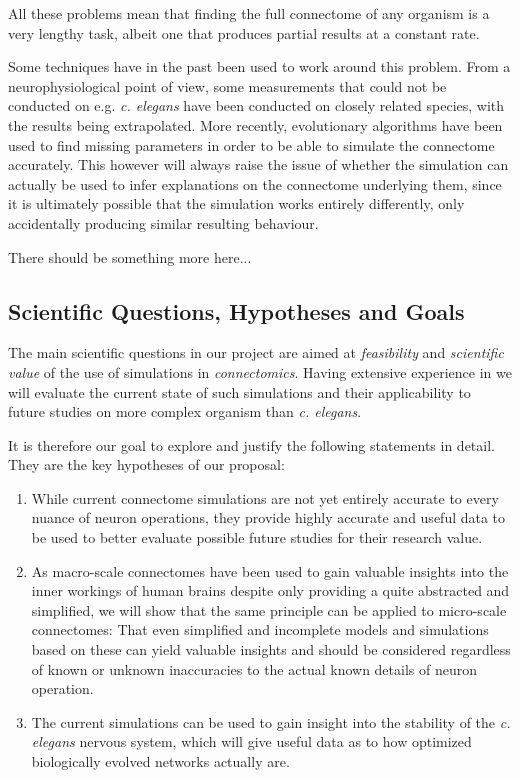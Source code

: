 \documentclass[a4paper,11pt]{article}
\begin{document}
All these problems mean that finding the full connectome of any organism is a very lengthy task, albeit one that produces partial results at a constant rate.

Some techniques have in the past been used to work around this problem. From a neurophysiological point of view, some measurements that could not be conducted on e.g. \emph{c. elegans} have been conducted on closely related species, with the results being extrapolated. More recently, evolutionary algorithms have been used to find missing parameters in order to be able to simulate the connectome accurately. This however will always raise the issue of whether the simulation can actually be used to infer explanations on the connectome underlying them, since it is ultimately possible that the simulation works entirely differently, only accidentally producing similar resulting behaviour. 

There should be something more here... 

\subsection{Scientific Questions, Hypotheses and Goals}

The main scientific questions in our project are aimed at \emph{feasibility} and  \emph{scientific value} of the use of simulations in \emph {connectomics}. Having extensive experience in  we will evaluate the current state of such simulations and their applicability to future studies on more complex organism than \emph{c. elegans}. 

It is therefore our goal to explore and justify the following statements in detail. They are the key hypotheses of our proposal:
\begin{enumerate}
\item While current connectome simulations are not yet entirely accurate to every nuance of neuron operations, they provide highly accurate and useful data to be used to better evaluate possible future studies for their research value. 
\item As macro-scale connectomes have been used to gain valuable insights into the inner workings of human brains despite only providing a quite abstracted and simplified, we will show that the same principle can be applied to micro-scale connectomes: That even simplified and incomplete models and simulations based on these can yield valuable insights and should be considered regardless of known or unknown inaccuracies to the actual known details of neuron operation. 
\item The current simulations can be used to gain insight into the stability of the \emph{c. elegans} nervous system, which will give useful data as to how optimized biologically evolved networks actually are. 
\end{enumerate}
\end{document}
